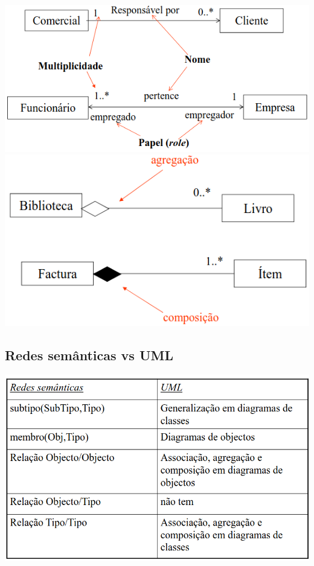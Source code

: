 \documentclass{article}
\begin{document}
\begin{center}
  \includegraphics[scale=0.35]{23}
  \includegraphics[scale=0.35]{24}
\end{center}

\subsection{Redes semânticas vs UML}

\begin{center}
  \includegraphics[scale=0.3]{25}
\end{center}
\end{document}
